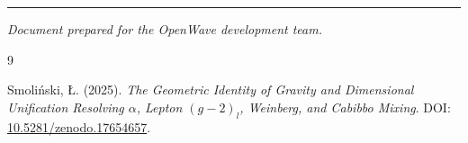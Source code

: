 \documentclass[11pt,a4paper]{article}
\begin{document}
	\bigskip
	\begin{center}
		\rule{0.5\textwidth}{0.4pt}
		\textit{Document prepared for the OpenWave development team.}\\[4pt]
	\end{center}
	
	\begin{thebibliography}{9}
		
		Smoliński, Ł. (2025).
		\textit{The Geometric Identity of Gravity and Dimensional Unification
			Resolving $\alpha$, Lepton $(g-2)_l$, Weinberg, and Cabibbo Mixing}.
		DOI: \href{https://doi.org/10.5281/zenodo.17654657}{10.5281/zenodo.17654657}.
		
	\end{thebibliography}
	
\end{document}
